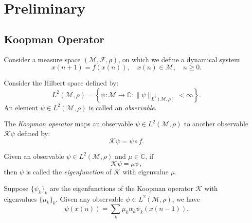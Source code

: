 

\section{Preliminary}

\subsection{Koopman Operator}

Consider a measure space $(\mathcal{M}, \mathcal{F}, \rho)$,
on which we define a dynamical system
\begin{equation*}
  x(n+1) = f(x(n)), \quad x(n) \in \mathcal{M}, \quad n \geq 0.
\end{equation*}

\begin{definition}
  Consider the Hilbert space defined by:
  \begin{equation*}
  L^2(\mathcal{M}, \rho) = \left\{ \psi: \mathcal{M} \rightarrow \mathbb{C}:
    \|\psi\|_{L^2(\mathcal{M},\rho)} < \infty \right\}.
  \end{equation*}
  An element $\psi \in L^2(\mathcal{M}, \rho)$ is called an \emph{observable}.
\end{definition}

\begin{definition}
  The \emph{Koopman operator} maps an observable $\psi \in L^2(\mathcal{M}, \rho)$
  to another observable $\mathcal{K} \psi$ defined by:
  \begin{equation*}
    \mathcal{K} \psi = \psi \circ f.
  \end{equation*}
\end{definition}

\begin{definition}
  Given an observable $\psi \in L^2(\mathcal{M}, \rho)$
  and $\mu \in \mathbb{C}$, if
  \begin{equation*}
    \mathcal{K} \psi = \mu \psi,
  \end{equation*}
  then $\psi$ is called the \emph{eigenfunction} of $\mathcal{K}$ with eigenvalue $\mu$.
\end{definition}

\begin{proposition}
  Suppose $\{\psi_k\}_k$ are the eigenfunctions of
  the Koopman operator $\mathcal{K}$
  with eigenvalues $\{\mu_k\}_k$.
  Given any observable $\psi \in L^2(\mathcal{M}, \rho)$,
  we have
  \begin{equation}
    \label{eq:koopman-mode-decomposition-one-step}
    \psi(x(n)) = \sum\limits_k \mu_k \alpha_k \psi_k(x(n-1)).
  \end{equation}
\end{proposition}

